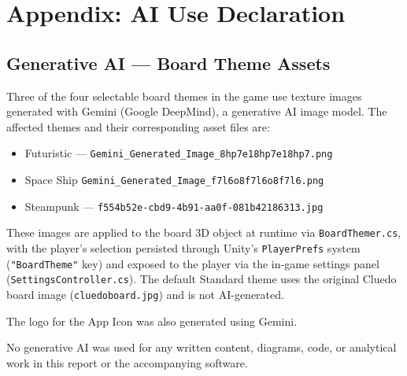 \chapter{Appendix: AI Use Declaration}
\label{chap:appendix}

\section*{Generative AI --- Board Theme Assets}

Three of the four selectable board themes in the game use texture images generated with Gemini (Google DeepMind), a generative AI image model. The affected themes and their corresponding asset files are:

\begin{itemize}
    \item Futuristic --- \texttt{Gemini\_Generated\_Image\_8hp7e18hp7e18hp7.png}
    \item Space Ship \texttt{Gemini\_Generated\_Image\_f7l6o8f7l6o8f7l6.png}
    \item Steampunk --- \texttt{f554b52e-cbd9-4b91-aa0f-081b42186313.jpg}
\end{itemize}

These images are applied to the board 3D object at runtime via \texttt{BoardThemer.cs}, with the player's selection persisted through Unity's \texttt{PlayerPrefs} system (\texttt{"BoardTheme"} key) and exposed to the player via the in-game settings panel (\texttt{SettingsController.cs}). The default Standard theme uses the original Cluedo board image (\texttt{cluedoboard.jpg}) and is not AI-generated.

The logo for the App Icon was also generated using Gemini. 

No generative AI was used for any written content, diagrams, code, or analytical work in this report or the accompanying software.
